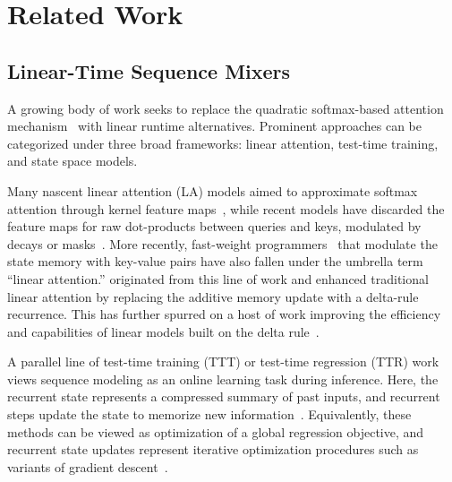 \section{Related Work}
\label{sec:related}

\subsection{Linear-Time Sequence Mixers} 
\label{sec:related:linear}

A growing body of work seeks to replace the quadratic softmax-based attention mechanism~\citep{vaswani2017attention,bahdanau2016neuralmachinetranslationjointly} with linear runtime alternatives.
Prominent approaches can be categorized under three broad frameworks: linear attention, test-time training, and state space models. 

Many nascent linear attention (LA) models aimed to approximate softmax attention through kernel feature maps~\citep{linearattention,performer}, while recent models have discarded the feature maps for raw dot-products between queries and keys, modulated by decays or masks~\citep{sun2023retentivenetworksuccessortransformer,yang2024gatedlinearattentiontransformers}.
More recently, fast-weight programmers~\citet{schlag2021deltarule} that modulate the state memory with key-value pairs have also fallen under the umbrella term ``linear attention.''
\citet{yang2025gateddeltanetworksimproving,yang2025parallelizinglineartransformersdelta} originated from this line of work and enhanced traditional linear attention by replacing the additive memory update with a delta-rule recurrence.
This has further spurred on a host of work improving the efficiency and capabilities of linear models built on the delta rule~\citep{kimiteam2025kimilinearexpressiveefficient, hu2025combaimprovingbilinearrnns}.

A parallel line of test-time training (TTT) or test-time regression (TTR) work views sequence modeling as an online learning task during inference.
Here, the recurrent state represents a compressed summary of past inputs, and recurrent steps update the state to memorize new information~\citep{sun2025learninglearntesttime,zhang2025testtimetrainingright,tandon2025endtoendtesttimetraininglong}.
Equivalently, these methods can be viewed as optimization of a global regression objective, and recurrent state updates represent iterative optimization procedures such as variants of gradient descent~\citep{wang2025testtimeregressionunifyingframework}.

